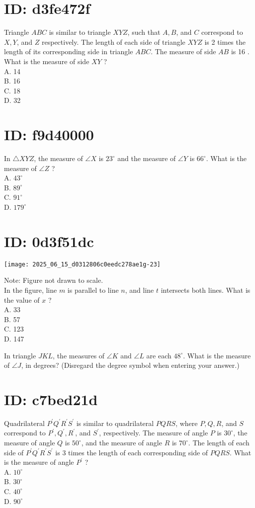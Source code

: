 
\section*{ID: d3fe472f}
Triangle $A B C$ is similar to triangle $X Y Z$, such that $A, B$, and $C$ correspond to $X, Y$, and $Z$ respectively. The length of each side of triangle $X Y Z$ is 2 times the length of its corresponding side in triangle $A B C$. The measure of side $A B$ is 16 . What is the measure of side $X Y$ ?\\
A. 14\\
B. 16\\
C. 18\\
D. 32

\section*{ID: f9d40000}
In $\triangle X Y Z$, the measure of $\angle X$ is $23^{\circ}$ and the measure of $\angle Y$ is $66^{\circ}$. What is the measure of $\angle Z$ ?\\
A. $43^{\circ}$\\
B. $89^{\circ}$\\
C. $91^{\circ}$\\
D. $179^{\circ}$

\section*{ID: 0d3f51dc}
\begin{center}
\texttt{[image: 2025\_06\_15\_d0312806c0eedc278ae1g-23]}
\end{center}

Note: Figure not drawn to scale.\\
In the figure, line $m$ is parallel to line $n$, and line $t$ intersects both lines. What is the value of $x$ ?\\
A. 33\\
B. 57\\
C. 123\\
D. 147

In triangle $J K L$, the measures of $\angle K$ and $\angle L$ are each $48^{\circ}$. What is the measure of $\angle J$, in degrees? (Disregard the degree symbol when entering your answer.)

\section*{ID: c7bed21d}
Quadrilateral $P^{\prime} Q^{\prime} R^{\prime} S^{\prime}$ is similar to quadrilateral $P Q R S$, where $P, Q, R$, and $S$ correspond to $P^{\prime}, Q^{\prime}, R^{\prime}$, and $S^{\prime}$, respectively. The measure of angle $P$ is $30^{\circ}$, the measure of angle $Q$ is $50^{\circ}$, and the measure of angle $R$ is $70^{\circ}$. The length of each side of $P^{\prime} Q^{\prime} R^{\prime} S^{\prime}$ is 3 times the length of each corresponding side of $P Q R S$. What is the measure of angle $P^{\prime}$ ?\\
A. $10^{\circ}$\\
B. $30^{\circ}$\\
C. $40^{\circ}$\\
D. $90^{\circ}$

